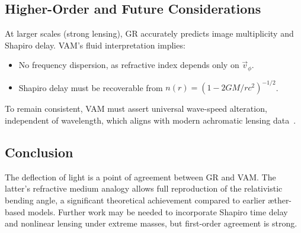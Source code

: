 \subsection*{Higher-Order and Future Considerations}
At larger scales (strong lensing), GR accurately predicts image multiplicity and Shapiro delay. VAM's fluid interpretation implies:
\begin{itemize}
    \item No frequency dispersion, as refractive index depends only on $\vec{v}_\phi$.
    \item Shapiro delay must be recoverable from $n(r) = (1 - 2GM/rc^2)^{-1/2}$.
\end{itemize}
To remain consistent, VAM must assert universal wave-speed alteration, independent of wavelength, which aligns with modern achromatic lensing data~\cite{eubanks1997vla, shapiro2004gravitational}.

\subsection*{Conclusion}
The deflection of light is a point of agreement between GR and VAM. The latter's refractive medium analogy allows full reproduction of the relativistic bending angle, a significant theoretical achievement compared to earlier æther-based models. Further work may be needed to incorporate Shapiro time delay and nonlinear lensing under extreme masses, but first-order agreement is strong.